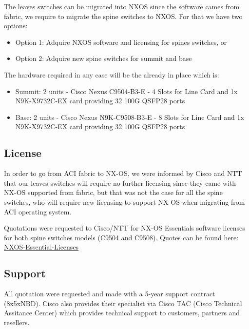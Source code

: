   The leaves switches can be migrated into NXOS since the software cames from fabric, we require to migrate the spine switches to NXOS. For that we have two options:

  \begin{itemize}
    \item Option 1: Adquire NXOS software and licensing for spines switches, or
    \item Option 2: Adquire new spine switches for summit and base
  \end{itemize}

  The hardware required in any case will be the already in place which is:

  \begin{itemize}
    \item Summit: 2 units - Cisco Nexus C9504-B3-E - 4 Slots for Line Card and 1x N9K-X9732C-EX card providing 32 100G QSFP28 ports
    \item Base: 2 units - Cisco Nexus N9K-C9508-B3-E - 8 Slots for Line Card and 1x N9K-X9732C-EX card providing 32 100G QSFP28 ports
  \end{itemize}

\newpage


  \subsection{License}

  In order to go from ACI fabric to NX-OS, we were informed by Cisco and NTT that our leaves switches will require no further licensing since they came with NX-OS supported from fabric, but that was not the case for all the spine switches, who will require new licensing to support NX-OS when migrating from ACI operating system.

  Quotations were requested to Cisco/NTT for NX-OS Essentials software licenses for both spine switches models (C9504 and C9508). Quotes can be found here: \href{https://confluence.lsstcorp.org/display/IT/ITTN-043+-+Rubin+Network+Re-Engineering?preview=/151855733/156506276/quote_nxos_licenses_march2021.pdf}{NXOS-Essential-Licenses}

\newpage

  \subsection{Support}

  All quotation were requested and made with a 5-year support contract (8x5xNBD). Cisco also provides their specialist via Cisco TAC (Cisco Technical Assitance Center) which provides technical support to customers, partners and resellers.

